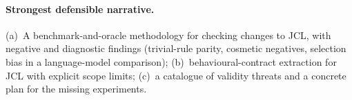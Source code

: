 \paragraph{Strongest defensible narrative.}
(a)~A benchmark-and-oracle methodology for checking changes to JCL, with
negative and diagnostic findings (trivial-rule parity, cosmetic negatives,
selection bias in a language-model comparison); (b)~behavioural-contract
extraction for JCL with explicit scope limits; (c)~a catalogue of validity
threats and a concrete plan for the missing experiments.
